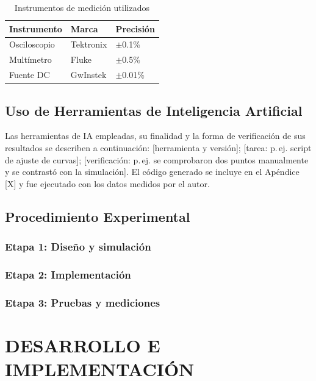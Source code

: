 \documentclass[12pt, letterpaper, oneside]{book}
\begin{document}
\begin{table}[H]
    \centering
    \caption{Instrumentos de medición utilizados}
    \begin{tabular}{@{}lll@{}}
        \toprule
        \textbf{Instrumento} & \textbf{Marca} & \textbf{Precisión} \\
        \midrule
        Osciloscopio & Tektronix & $\pm$0.1\% \\
        Multímetro & Fluke & $\pm$0.5\% \\
        Fuente DC & GwInstek & $\pm$0.01\% \\
        \bottomrule
    \end{tabular}
    \label{tab:instrumentos}
\end{table}

\section{Uso de Herramientas de Inteligencia Artificial}
Las herramientas de IA empleadas, su finalidad y la forma de verificación de sus resultados se describen a continuación: [herramienta y versión]; [tarea: p.\,ej. script de ajuste de curvas]; [verificación: p.\,ej. se comprobaron dos puntos manualmente y se contrastó con la simulación]. El código generado se incluye en el Apéndice [X] y fue ejecutado con los datos medidos por el autor.

\section{Procedimiento Experimental}
\subsection{Etapa 1: Diseño y simulación}
\subsection{Etapa 2: Implementación}
\subsection{Etapa 3: Pruebas y mediciones}

\chapter{DESARROLLO E IMPLEMENTACIÓN}
\end{document}
